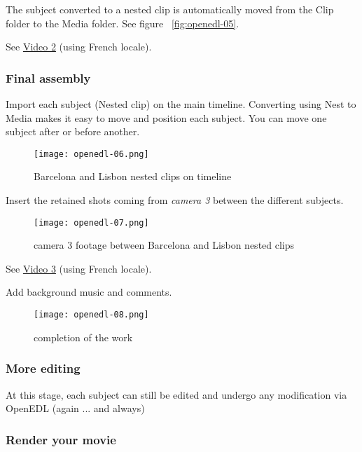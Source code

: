 The subject converted to a nested clip is automatically moved from the Clip folder to the Media folder. See figure ~\ref{fig:openedl-05}.

See \href{https://youtu.be/kQ7sGq0o44U}{Video 2} (using French locale).

\subsubsection*{Final assembly}
\label{ssub:final_assembly}

Import each subject (Nested clip) on the main timeline. Converting using Nest to Media makes it easy to move and position each subject. You can move one subject after or before another.

\begin{figure}[htpb]
	\centering
	\texttt{[image: openedl-06.png]}
	\caption{Barcelona and Lisbon nested clips on timeline}
	\label{fig:openedl-06}
\end{figure}

Insert the retained shots coming from \textit{camera 3} between the different subjects.

\begin{figure}[htpb]
	\centering
	\texttt{[image: openedl-07.png]}
	\caption{camera 3 footage between Barcelona and Lisbon nested clips}
	\label{fig:openedl-07}
\end{figure}

See \href{https://youtu.be/9Hz0a-1i3I8}{Video 3} (using French locale).

Add background music and comments.

\begin{figure}[htpb]
	\centering
	\texttt{[image: openedl-08.png]}
	\caption{completion of the work}
	\label{fig:openedl-08}
\end{figure}

\subsubsection*{More editing}
\label{ssub:more_editing}

At this stage, each subject can still be edited and undergo any modification via OpenEDL (again ... and always)

\subsubsection*{Render your movie}
\label{ssub:render_movie}

